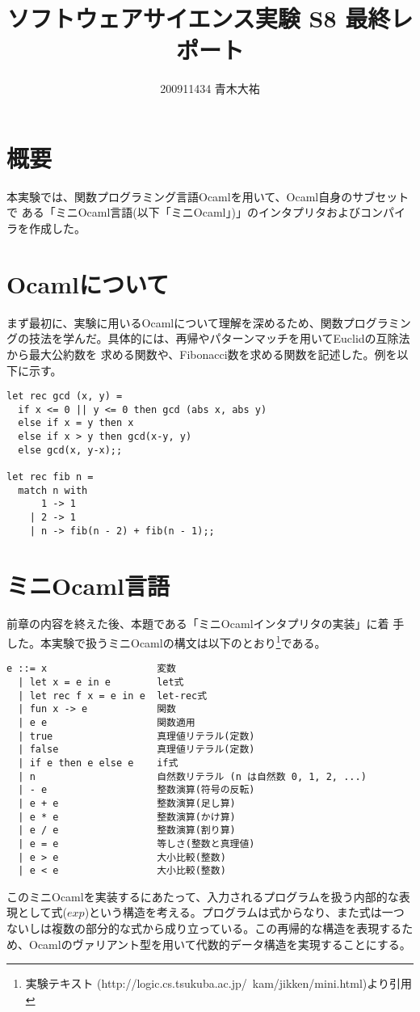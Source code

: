 \documentclass[a4paper,9pt]{jsarticle}
\title{ソフトウェアサイエンス実験 S8 最終レポート}
\author{200911434 青木大祐}
\begin{document}
\maketitle
\newpage

\section{概要}
本実験では、関数プログラミング言語Ocamlを用いて、Ocaml自身のサブセットで
ある「ミニOcaml言語(以下「ミニOcaml」)」のインタプリタおよびコンパイラを作成した。

\section{Ocamlについて}
まず最初に、実験に用いるOcamlについて理解を深めるため、関数プログラミン
グの技法を学んだ。具体的には、再帰やパターンマッチを用いてEuclidの互除法から最大公約数を
求める関数や、Fibonacci数を求める関数を記述した。例を以下に示す。


\begin{lstlisting}
let rec gcd (x, y) =   
  if x <= 0 || y <= 0 then gcd (abs x, abs y)
  else if x = y then x
  else if x > y then gcd(x-y, y)
  else gcd(x, y-x);;

let rec fib n = 
  match n with
      1 -> 1
    | 2 -> 1
    | n -> fib(n - 2) + fib(n - 1);;
\end{lstlisting}

\section{ミニOcaml言語}
前章の内容を終えた後、本題である「ミニOcamlインタプリタの実装」に着
手した。本実験で扱うミニOcamlの構文は以下のとおり\footnote{実験テキスト
(http://logic.cs.tsukuba.ac.jp/~kam/jikken/mini.html)より引用}である。

\begin{lstlisting}
e ::= x                   変数
  | let x = e in e        let式
  | let rec f x = e in e  let-rec式
  | fun x -> e            関数
  | e e	                  関数適用
  | true                  真理値リテラル(定数)
  | false                 真理値リテラル(定数)
  | if e then e else e    if式
  | n                     自然数リテラル (n は自然数 0, 1, 2, ...)
  | - e                   整数演算(符号の反転)
  | e + e                 整数演算(足し算)
  | e * e                 整数演算(かけ算)
  | e / e                 整数演算(割り算)
  | e = e                 等しさ(整数と真理値)
  | e > e                 大小比較(整数)
  | e < e                 大小比較(整数)
\end{lstlisting}
このミニOcamlを実装するにあたって、入力されるプログラムを扱う内部的な表
現として式($exp$)という構造を考える。プログラムは式からなり、また式は一つ
ないしは複数の部分的な式から成り立っている。この再帰的な構造を表現するた
め、Ocamlのヴァリアント型を用いて代数的データ構造を実現することにする。\\
\end{document}
